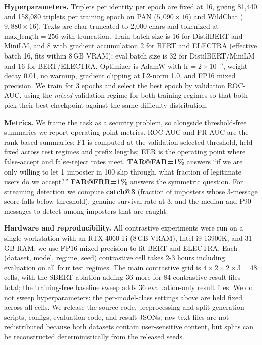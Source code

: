 \documentclass[11pt]{article}
\begin{document}
\noindent\textbf{Hyperparameters.} Triplets per identity per epoch are fixed at 16, giving 81{,}440 and 158{,}080 triplets per training epoch on PAN ($5{,}090 \times 16$) and WildChat ($9{,}880 \times 16$). Texts are char-truncated to 2{,}000 chars and tokenized at $\text{max\_length}=256$ with truncation. Train batch size is 16 for DistilBERT and MiniLM, and 8 with gradient accumulation 2 for BERT and ELECTRA (effective batch 16, fits within 8\,GB VRAM); eval batch size is 32 for DistilBERT/MiniLM and 16 for BERT/ELECTRA. Optimizer is AdamW with $\text{lr}=2\!\times\!10^{-5}$, weight decay 0.01, no warmup, gradient clipping at L2-norm 1.0, and FP16 mixed precision. We train for 3 epochs and select the best epoch by validation ROC-AUC, using the \textit{mixed} validation regime for both training regimes so that both pick their best checkpoint against the same difficulty distribution.

\noindent\textbf{Metrics.} We frame the task as a security problem, so alongside threshold-free summaries we report operating-point metrics. ROC-AUC and PR-AUC are the rank-based summaries; F1 is computed at the validation-selected threshold, held fixed across test regimes and prefix lengths; EER is the operating point where false-accept and false-reject rates meet. \textbf{TAR@FAR=1\%} answers ``if we are only willing to let 1 imposter in 100 slip through, what fraction of legitimate users do we accept?'' \textbf{FAR@FRR=1\%} answers the symmetric question. For streaming detection we compute \textbf{catch@3} (fraction of imposters whose 3-message score falls below threshold), genuine survival rate at 3, and the median and P90 messages-to-detect among imposters that are caught.

\noindent\textbf{Hardware and reproducibility.} All contrastive experiments were run on a single workstation with an RTX 4060\,Ti (8\,GB VRAM), Intel i9-13900K, and 31\,GB RAM; we use FP16 mixed precision to fit BERT and ELECTRA. Each (dataset, model, regime, seed) contrastive cell takes 2-3 hours including evaluation on all four test regimes. The main contrastive grid is $4{\times}2{\times}2{\times}3=48$ cells, with the SBERT ablation adding 36 more for 84 contrastive result files total; the training-free baseline sweep adds 36 evaluation-only result files. We do not sweep hyperparameters: the per-model-class settings above are held fixed across all cells. We release the source code, preprocessing and split-generation scripts, configs, evaluation code, and result JSONs; raw text files are not redistributed because both datasets contain user-sensitive content, but splits can be reconstructed deterministically from the released seeds.
\end{document}
